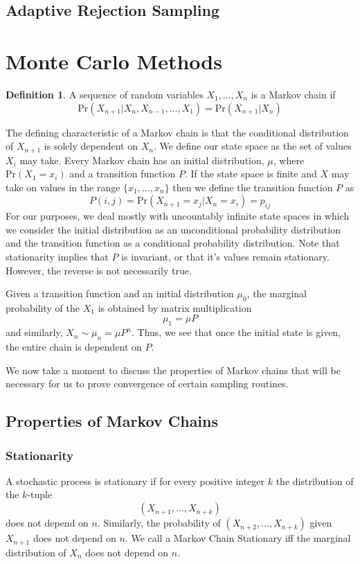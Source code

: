 \documentclass[11pt, a4paper]{article}
\theoremstyle{plain}
\theoremstyle{definition}
\newtheorem{defn}[thm]{Definition} %
\newcommand{\pr}{\mathrm{Pr}}
\begin{document}
\subsection{Adaptive Rejection Sampling}

\section{Monte Carlo Methods}

\begin{defn}
A sequence of random variables 
$X_1, \ldots, X_n$ is a Markov chain if
\begin{equation}
\pr(X_{n + 1} | X_n, X_{n-1}, \ldots, X_1) =\pr(X_{n + 1} | X_n) 
\end{equation}
\end{defn}
The defining characteristic of a Markov chain is that the conditional
distribution of $X_{n+1}$ is solely dependent on $X_n$. We define our state
space as the set of values $X_i$ may take. Every Markov chain has an initial
distribution, $\mu$, where $\pr{(X_1 = x_i)}$ and a transition function $P$. If the state
space is finite and $X$ may take on values in the range $\{x_1, \ldots, x_n\}$ 
then we define the transition function $P$ as $$P(i, j) = \pr{(X_{n+1} = x_j | X_{n} = x_i)} = p_{ij}$$
For our purposes, we deal mostly with uncountably infinite state spaces in which we
consider the initial distribution as an unconditional probability distribution
and the transition function as a conditional probability distribution. Note that
stationarity implies that $P$ is invariant, or that it's values remain stationary.
However, the reverse is not necessarily true.

Given a transition function and an initial distribution $\mu_0$, the marginal
probability of the $X_1$ is obtained by matrix multiplication $$\mu_1 = \mu P$$
and similarly, $X_n \sim \mu_n = \mu P^n$. Thus, we see that once the initial
state is given, the entire chain is dependent on $P$.

We now take a moment to discuss the properties of Markov chains that will 
be necessary for us to prove convergence of certain sampling routines.
\subsection{Properties of Markov Chains}
\subsubsection{Stationarity}
A stochastic process is stationary if for every positive integer $k$
the distribution of the $k$-tuple
$$(X_{n+1}, \ldots, X_{n+k})$$ does not depend on $n$. Similarly, 
the probability of $(X_{n+2}, \ldots, X_{n+k})$ given $X_{n+1}$ does
not depend on $n$. We call a Markov Chain Stationary iff the marginal distribution of $X_n$
does not depend on $n$.
\end{document}

